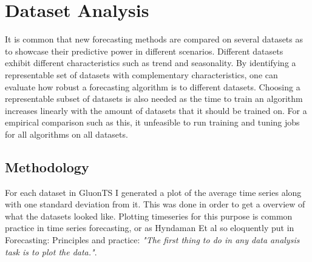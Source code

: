 



\graphicspath{{4/figures/}}

\section{Dataset Analysis}
It is common that new forecasting methods are compared on several datasets as to showcase their predictive power in different scenarios. Different datasets exhibit different characteristics such as trend and seasonality. By identifying a representable set of datasets with complementary characteristics, one can evaluate how robust a forecasting algorithm is to different datasets. Choosing a representable subset of datasets is also needed as the time to train an algorithm increases linearly with the amount of datasets that it should be trained on. For a empirical comparison such as this, it unfeasible to run training and tuning jobs for all algorithms on all datasets. 

\subsection{Methodology}

For each dataset in GluonTS I generated a plot of the average time series along with one standard deviation from it. This was done in order to get a overview of what the datasets looked like. Plotting timeseries for this purpose is common practice in time series forecasting, or as Hyndaman Et al so eloquently put in Forecasting: Principles and practice: \textit{"The first thing to do in any data analysis task is to plot the data."}.\cite{hyndman_forecasting_3rd} 


